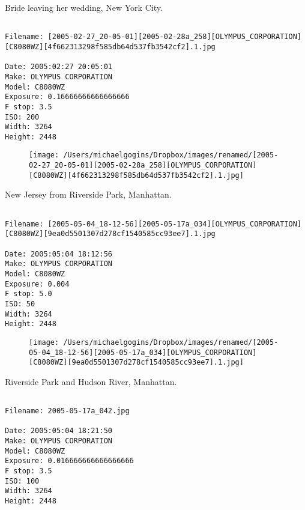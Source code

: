 \documentclass[11pt,letter,DIV=14,paper=landscape]{scrbook}
\begin{document}
\clearpage
\noindent Bride leaving her wedding, New York City.
\noindent
\begin{lstlisting}

Filename: [2005-02-27_20-05-01][2005-02-28a_258][OLYMPUS_CORPORATION][C8080WZ][4f662313298f585db64d537fb3542cf2].1.jpg

Date: 2005:02:27 20:05:01
Make: OLYMPUS CORPORATION
Model: C8080WZ
Exposure: 0.16666666666666666
F stop: 3.5
ISO: 200
Width: 3264
Height: 2448
\end{lstlisting}
\clearpage

\begin{figure}
\texttt{[image: /Users/michaelgogins/Dropbox/images/renamed/[2005-02-27\_20-05-01][2005-02-28a\_258][OLYMPUS\_CORPORATION][C8080WZ][4f662313298f585db64d537fb3542cf2].1.jpg]}
\end{figure}
    
\clearpage
\noindent New Jersey from Riverside Park, Manhattan.
\noindent
\begin{lstlisting}

Filename: [2005-05-04_18-12-56][2005-05-17a_034][OLYMPUS_CORPORATION][C8080WZ][9ea0d5501307d278cf1540585cc93ee7].1.jpg

Date: 2005:05:04 18:12:56
Make: OLYMPUS CORPORATION
Model: C8080WZ
Exposure: 0.004
F stop: 5.0
ISO: 50
Width: 3264
Height: 2448
\end{lstlisting}
\clearpage

\begin{figure}
\texttt{[image: /Users/michaelgogins/Dropbox/images/renamed/[2005-05-04\_18-12-56][2005-05-17a\_034][OLYMPUS\_CORPORATION][C8080WZ][9ea0d5501307d278cf1540585cc93ee7].1.jpg]}
\end{figure}
    
\clearpage
\noindent Riverside Park and Hudson River, Manhattan.
\noindent
\begin{lstlisting}

Filename: 2005-05-17a_042.jpg

Date: 2005:05:04 18:21:50
Make: OLYMPUS CORPORATION
Model: C8080WZ
Exposure: 0.016666666666666666
F stop: 3.5
ISO: 100
Width: 3264
Height: 2448
\end{lstlisting}
\clearpage
\end{document}
